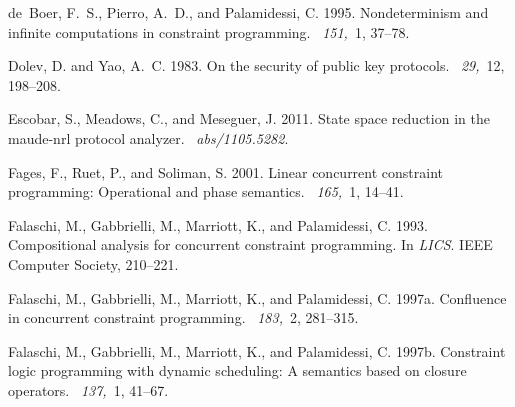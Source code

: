 \documentclass{tlp}
\begin{document}
\begin{thebibliography}{}
{\sc de~Boer, F.~S.}, {\sc Pierro, A.~D.}, {\sc and} {\sc Palamidessi, C.}
  1995.
\newblock Nondeterminism and infinite computations in constraint programming.
~{\em 151,\/}~1, 37--78.

{\sc Dolev, D.} {\sc and} {\sc Yao, A.~C.} 1983.
\newblock On the security of public key protocols.
~{\em 29,\/}~12,
  198--208.

{\sc Escobar, S.}, {\sc Meadows, C.}, {\sc and} {\sc Meseguer, J.} 2011.
\newblock State space reduction in the maude-nrl protocol analyzer.
~{\em abs/1105.5282}.

{\sc Fages, F.}, {\sc Ruet, P.}, {\sc and} {\sc Soliman, S.} 2001.
\newblock Linear concurrent constraint programming: Operational and phase
  semantics.
~{\em 165,\/}~1, 14--41.

{\sc Falaschi, M.}, {\sc Gabbrielli, M.}, {\sc Marriott, K.}, {\sc and} {\sc
  Palamidessi, C.} 1993.
\newblock Compositional analysis for concurrent constraint programming.
\newblock In {\em LICS}. IEEE Computer Society, 210--221.

{\sc Falaschi, M.}, {\sc Gabbrielli, M.}, {\sc Marriott, K.}, {\sc and} {\sc
  Palamidessi, C.} 1997a.
\newblock Confluence in concurrent constraint programming.
~{\em 183,\/}~2, 281--315.

{\sc Falaschi, M.}, {\sc Gabbrielli, M.}, {\sc Marriott, K.}, {\sc and} {\sc
  Palamidessi, C.} 1997b.
\newblock Constraint logic programming with dynamic scheduling: A semantics
  based on closure operators.
~{\em 137,\/}~1, 41--67.


\end{thebibliography}
\end{document}
